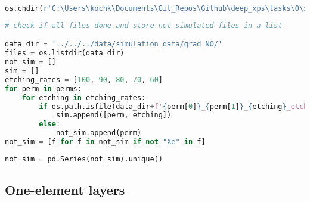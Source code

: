 \begin{lstlisting}[language=Python]
os.chdir(r'C:\Users\kochk\Documents\Git_Repos\Github\deep_xps\tasks\0\simulation')
\end{lstlisting}

\begin{lstlisting}[language=Python]
# check if all files done and store not simulated files in a list

data_dir = '../../../data/simulation_data/grad_NO/'
files = os.listdir(data_dir)
not_sim = []
sim = []
etching_rates = [100, 90, 80, 70, 60]
for perm in perms:
    for etching in etching_rates:
        if os.path.isfile(data_dir+f'{perm[0]}_{perm[1]}_{etching}_etching_spectra.spcreg1.spc'):
            sim.append([perm, etching])
        else:
            not_sim.append(perm)
not_sim = [f for f in not_sim if not "Xe" in f]
\end{lstlisting}

\begin{lstlisting}[language=Python]
not_sim = pd.Series(not_sim).unique()
\end{lstlisting}

\hypertarget{one-element-layers}{%
\subsection*{One-element layers}\label{one-element-layers}}


